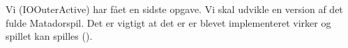 Vi (IOOuterActive) har fået en sidste opgave. Vi skal udvikle en version af det fulde Matadorspil. Det er vigtigt at det er er blevet implementeret virker og spillet kan spilles (\cite{noauthor_cdio_nodate}).

